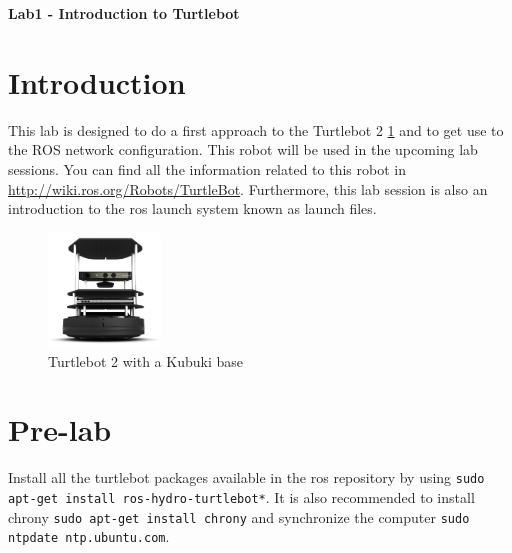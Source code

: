 \documentclass[a4paper,10pt]{article}
\begin{document}
\marginsize{2cm}{2cm}{2cm}{2cm}

\begin{center}
\Large \textbf{Lab1 - Introduction to Turtlebot}
\end{center}

\section{Introduction}

This lab is designed to do a first approach to the Turtlebot 2 \ref{fig:turtlebot2} and to get use to the ROS network configuration. This robot will be used in the upcoming lab sessions. You can find all the information related to this robot in \url{http://wiki.ros.org/Robots/TurtleBot}. Furthermore, this lab session is also an introduction to the ros launch system known as launch files.

\begin{figure}[h!]
	\centering
	\includegraphics[width=3cm]{turtlebot2}
	\caption{Turtlebot 2 with a Kubuki base}
	\label{fig:turtlebot2}
\end{figure}


\section{Pre-lab}

Install all the turtlebot packages available in the ros repository by using \texttt{sudo apt-get install ros-hydro-turtlebot*}. It is also recommended to install chrony \texttt{sudo apt-get install chrony} and synchronize the computer \texttt{sudo ntpdate ntp.ubuntu.com}.
\end{document}
